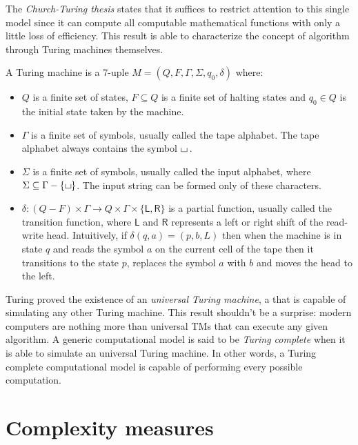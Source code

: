 The \textit{Church-Turing thesis} states that it suffices to restrict attention to this single model since it can compute all computable mathematical functions with only a little loss of efficiency. This result is able to characterize the concept of algorithm through Turing machines themselves. \cite{complexity_arora_barak}

\begin{definition}
    A Turing machine is a 7-uple $M = (Q, F, \Gamma, \Sigma, q_0, \delta)$ where:
    \begin{itemize}
        \item $Q$ is a finite set of states, $F \subseteq Q$ is a finite set of halting states and $q_0 \in Q$ is the initial state taken by the machine.
        \item $\Gamma$ is a finite set of symbols, usually called the tape alphabet. The tape alphabet always contains the symbol $\blankchar\,$.
        \item $\Sigma$ is a finite set of symbols, usually called the input alphabet, where $\Sigma \subseteq \Gamma - \{\blankchar\}$. The input string can be formed only of these characters.
        \item $\delta : (Q - F) \times \Gamma \to Q \times \Gamma \times \{\mathsf{L}, \mathsf{R}\}$ is a partial function, usually called the transition function, where $\mathsf{L}$ and $\mathsf{R}$ represents a left or right shift of the read-write head. Intuitively, if $\delta(q, a) = (p, b, L)$ then when the machine is in state $q$ and reads the symbol $a$ on the current cell of the tape then it transitions to the state $p$, replaces the symbol $a$ with $b$ and moves the head to the left.
    \end{itemize}
\end{definition}

Turing proved the existence of an \textit{universal Turing machine}, a \TM that is capable of simulating any other Turing machine. This result shouldn't be a surprise: modern computers are nothing more than universal \textsf{TM}s that can execute any given algorithm. A generic computational model is said to be \textit{Turing complete} when it is able to simulate an universal Turing machine. In other words, a Turing complete computational model is capable of performing every possible computation.

\newpage

\section{Complexity measures}

